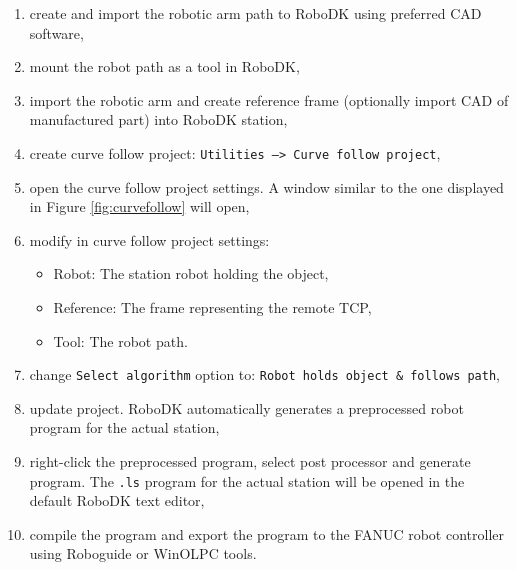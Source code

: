 \begin{enumerate}

\item create and import the robotic arm path to RoboDK using preferred CAD software,

\item mount the robot path as a tool in RoboDK,

\item import the robotic arm and create reference frame (optionally import CAD of manufactured part) into RoboDK station, 

\item create curve follow project: \texttt{Utilities --> Curve follow project},

\item open the curve follow project settings. A window similar to the one displayed in Figure \ref{fig:curvefollow} will open, 

\item modify in curve follow project settings:

    \begin{itemize}

        \item Robot: The station robot holding the object,
        \item Reference: The frame representing the remote TCP,
        \item Tool: The robot path.
        
    \end{itemize}
    
\item change \texttt{Select algorithm} option to: \texttt{Robot holds object \& follows path},

\item update project. RoboDK automatically generates a preprocessed robot program for the actual station,

\item right-click the preprocessed program, select post processor and generate program. The \texttt{.ls} program for the actual station will be opened in the default RoboDK text editor,

\item compile the program and export the program to the FANUC robot controller using Roboguide or WinOLPC tools.
    
\end{enumerate}


